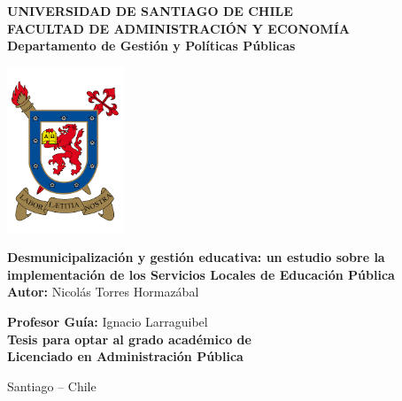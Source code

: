 \begin{titlepage}
    \begin{flushleft}
        \vspace{2.5cm}
        \begin{minipage}{0.7\textwidth}
            {\fontsize{14}{14}\selectfont \textbf{UNIVERSIDAD DE SANTIAGO DE CHILE}} \\[0.2cm]
            {\fontsize{12}{12}\selectfont \textbf{FACULTAD DE ADMINISTRACIÓN Y ECONOMÍA}} \\[0.2cm]
            {\fontsize{12}{12}\selectfont \textbf{Departamento de Gestión y Políticas Públicas}}
        \end{minipage}
        \hfill
        \begin{minipage}{0.2\textwidth}
            \centering
            \includegraphics[width=3.5cm]{archivos/logo_usach.png}
        \end{minipage}
    \end{flushleft}

    \vspace{3cm}

    \begin{center}
        {\fontsize{12}{12}\selectfont \textbf{Desmunicipalización y gestión educativa: un estudio sobre la implementación de los Servicios Locales de Educación Pública}} \\[5.5cm]

        {\fontsize{12}{12}\selectfont \textbf{Autor:} Nicolás Torres Hormazábal} \\[2cm]
    \end{center}

    \begin{flushright}
        {\fontsize{12}{12}\selectfont \textbf{Profesor Guía:} Ignacio Larraguibel} \\[1cm]

        {\fontsize{12}{12}\selectfont 
        \textbf{Tesis para optar al grado académico de} \\
        \textbf{Licenciado en Administración Pública}} \\[2cm]
    \end{flushright}

    \begin{center}
        {\fontsize{12}{12}\selectfont Santiago – Chile} \\[0.3cm]
        {\fontsize{12}{12}}  
    \end{center}
\end{titlepage}